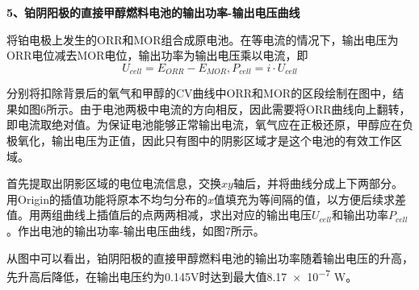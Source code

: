 \noindent \textbf{5、铂阴阳极的直接甲醇燃料电池的输出功率-输出电压曲线} \par
将铂电极上发生的ORR和MOR组合成原电池。在等电流的情况下，输出电压为ORR电位减去MOR电位，输出功率为输出电压乘以电流，即
$$U_{cell}=E_{ORR}-E_{MOR},P_{cell}=i\cdot U_{cell}$$\par 
分别将扣除背景后的氧气和甲醇的CV曲线中ORR和MOR的区段绘制在图中，结果如图6所示。由于电池两极中电流的方向相反，因此需要将ORR曲线向上翻转，即电流取绝对值。为保证电池能够正常输出电流，氧气应在正极还原，甲醇应在负极氧化，输出电压为正值，因此只有图中的阴影区域才是这个电池的有效工作区域。\par
{}
首先提取出阴影区域的电位电流信息，交换$xy$轴后，并将曲线分成上下两部分。用Origin的插值功能将原本不均匀分布的$x$值填充为等间隔的值，以方便后续求差值。用两组曲线上插值后的点两两相减，求出对应的输出电压$U_{cell}$和输出功率$P_{cell}$。作出电池的输出功率-输出电压曲线，如图7所示。\par
{}
从图中可以看出，铂阴阳极的直接甲醇燃料电池的输出功率随着输出电压的升高，先升高后降低，在输出电压约为0.145V时达到最大值\num{8.17e-7} W。\par


